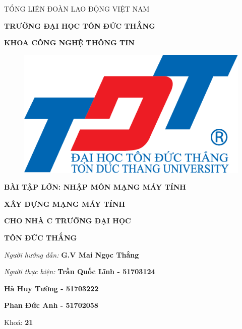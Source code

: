 \documentclass{report}
\begin{document}
\newcommand{\xfill}[2][1ex]{{%
  \dimen0=#2\advance\dimen0 by #1
  \leaders\hrule height \dimen0 depth -#1\hfill%
}}

\changefontsizes[14pt]{12pt}
\centerline{TỔNG LIÊN ĐOÀN LAO ĐỘNG VIỆT NAM}

\changefontsizes[14pt]{11pt}
\centerline{\textbf{TRƯỜNG ĐẠI HỌC TÔN ĐỨC THẮNG}}
\centerline{\textbf{KHOA CÔNG NGHỆ THÔNG TIN}}

\begin{center}
    \begin{figure}[htp]
    \begin{center}
     \includegraphics[scale=.2]{logo}
    \end{center}
    \end{figure}
\end{center}

\changefontsizes{16pt}
\centerline{\textbf{BÀI TẬP LỚN: NHẬP MÔN MẠNG MÁY TÍNH}}
\vspace{1.5cm}
\changefontsizes{24pt}
\centerline{\textbf{XÂY DỰNG MẠNG MÁY TÍNH}}
\centerline{\textbf{CHO NHÀ C TRƯỜNG ĐẠI HỌC}}
\centerline{\textbf{TÔN ĐỨC THẮNG}}

\vspace{4cm}
\begin{flushright}
\renewcommand{\baselinestretch}{0.05}
\changefontsizes{14pt}
\textit{Người hướng dẫn: }\textbf{G.V Mai Ngọc Thắng}
\setlength{\parskip}{0.5em}

\textit{Người thực hiện: }\textbf{Trần Quốc Lĩnh - 51703124}
\setlength{\parskip}{0.5em}

\textit{}\textbf{Hà Huy Tường - 51703222}
\setlength{\parskip}{0.5em}

\textit{}\textbf{Phan Đức Anh - 51702058}
\setlength{\parskip}{0.75em}

Khoá: \textbf{21}
\setlength{\parskip}{0.5em}

\end{flushright}
\end{document}
